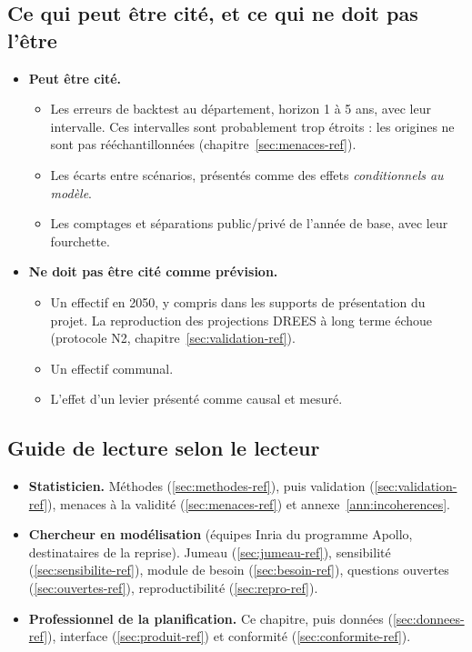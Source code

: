 \subsection{Ce qui peut être cité, et ce qui ne doit pas l'être}\label{int:citer}
\begin{itemize}
\item \textbf{Peut être cité.}
  \begin{itemize}
  \item Les erreurs de backtest au département, horizon 1 à 5 ans, avec leur intervalle. Ces intervalles sont
    probablement trop étroits : les origines ne sont pas rééchantillonnées (chapitre~\ref{sec:menaces-ref}).
  \item Les écarts entre scénarios, présentés comme des effets \emph{conditionnels au modèle}.
  \item Les comptages et séparations public/privé de l'année de base, avec leur fourchette.
  \end{itemize}
\item \textbf{Ne doit pas être cité comme prévision.}
  \begin{itemize}
  \item Un effectif en 2050, y compris dans les supports de présentation du projet. La reproduction des
    projections DREES à long terme échoue (protocole N2, chapitre~\ref{sec:validation-ref}).
  \item Un effectif communal.
  \item L'effet d'un levier présenté comme causal et mesuré.
  \end{itemize}
\end{itemize}

\subsection{Guide de lecture selon le lecteur}
\begin{itemize}
\item \textbf{Statisticien.} Méthodes (\ref{sec:methodes-ref}), puis validation (\ref{sec:validation-ref}),
  menaces à la validité (\ref{sec:menaces-ref}) et annexe~\ref{ann:incoherences}.
\item \textbf{Chercheur en modélisation} (équipes Inria du programme Apollo, destinataires de la reprise). Jumeau (\ref{sec:jumeau-ref}), sensibilité
  (\ref{sec:sensibilite-ref}), module de besoin (\ref{sec:besoin-ref}), questions ouvertes (\ref{sec:ouvertes-ref}), reproductibilité
  (\ref{sec:repro-ref}).
\item \textbf{Professionnel de la planification.} Ce chapitre, puis données (\ref{sec:donnees-ref}), interface
  (\ref{sec:produit-ref}) et conformité (\ref{sec:conformite-ref}).
\end{itemize}


